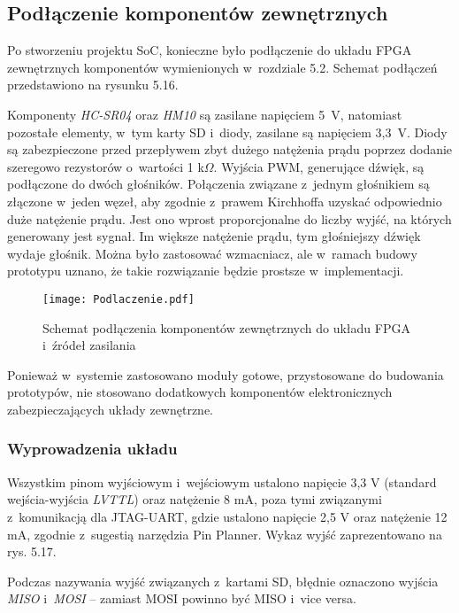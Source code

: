 \subsection{Podłączenie komponentów zewnętrznych}

Po stworzeniu projektu SoC, konieczne było podłączenie do układu FPGA zewnętrznych komponentów wymienionych w~rozdziale 5.2. Schemat podłączeń przedstawiono na rysunku 5.16.

Komponenty \textit{HC-SR04} oraz \textit{HM10} są zasilane napięciem 5~V, natomiast pozostałe elementy, w~tym karty SD i~diody, zasilane są napięciem 3,3~V. Diody są zabezpieczone przed przepływem zbyt dużego natężenia prądu poprzez dodanie szeregowo rezystorów o~wartości 1 k$\Omega$. Wyjścia PWM, generujące dźwięk, są podłączone do dwóch głośników. Połączenia związane z~jednym głośnikiem są złączone w~jeden węzeł, aby zgodnie z~prawem Kirchhoffa uzyskać odpowiednio duże natężenie prądu. Jest ono wprost proporcjonalne do liczby wyjść, na których generowany jest sygnał. Im większe natężenie prądu, tym głośniejszy dźwięk wydaje głośnik. Można było zastosować wzmacniacz, ale w~ramach budowy prototypu uznano, że takie rozwiązanie będzie prostsze w~implementacji.

\begin{figure}[h]
	\centering
	\texttt{[image: Podlaczenie.pdf]}
	\caption{Schemat podłączenia komponentów zewnętrznych do układu FPGA i~źródeł zasilania}
\end{figure}
\FloatBarrier %

Ponieważ w~systemie zastosowano moduły gotowe, przystosowane do budowania prototypów, nie stosowano dodatkowych komponentów elektronicznych zabezpieczających układy zewnętrzne.

\subsubsection{Wyprowadzenia układu}

Wszystkim pinom wyjściowym i~wejściowym ustalono napięcie 3,3 V (standard wejścia-wyjścia \textit{LVTTL}) oraz natężenie 8 mA, poza tymi związanymi z~komunikacją dla JTAG-UART, gdzie ustalono napięcie 2,5 V oraz natężenie 12 mA, zgodnie z~sugestią narzędzia Pin Planner. Wykaz wyjść zaprezentowano na rys. 5.17.

Podczas nazywania wyjść związanych z~kartami SD, błędnie oznaczono wyjścia \textit{MISO} i~\textit{MOSI} – zamiast MOSI powinno być MISO i~vice versa.

